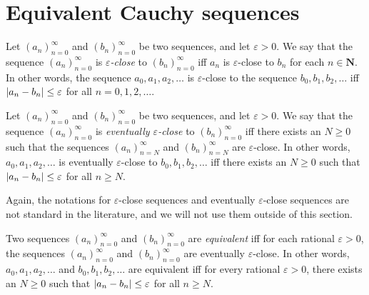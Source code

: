 \section{Equivalent Cauchy sequences}\label{sec 5.2}

\begin{definition}\label{5.2.1}
Let \((a_n)_{n = 0}^{\infty}\) and \((b_n)_{n = 0}^{\infty}\) be two sequences, and let \(\varepsilon > 0\).
We say that the sequence \((a_n)_{n = 0}^{\infty}\) is \emph{\(\varepsilon\)-close} to \((b_n)_{n = 0}^{\infty}\) iff \(a_n\) is \(\varepsilon\)-close to \(b_n\) for each \(n \in \mathbf{N}\).
In other words, the sequence \(a_0, a_1, a_2, \dots\) is \(\varepsilon\)-close to the sequence \(b_0, b_1, b_2, \dots\) iff \(\abs*{a_n - b_n} \leq \varepsilon\) for all \(n = 0, 1, 2, \dots\).
\end{definition}

\setcounter{theorem}{2}
\begin{definition}\label{5.2.3}
Let \((a_n)_{n = 0}^{\infty}\) and \((b_n)_{n = 0}^{\infty}\) be two sequences, and let \(\varepsilon > 0\).
We say that the sequence \((a_n)_{n = 0}^{\infty}\) is \emph{eventually \(\varepsilon\)-close} to \((b_n)_{n = 0}^{\infty}\) iff there exists an \(N \geq 0\) such that the sequences \((a_n)_{n = N}^{\infty}\) and \((b_n)_{n = N}^{\infty}\) are \(\varepsilon\)-close.
In other words, \(a_0, a_1, a_2, \dots\) is eventually \(\varepsilon\)-close to \(b_0, b_1, b_2, \dots\) iff there exists an \(N \geq 0\) such that \(\abs*{a_n - b_n} \leq \varepsilon\) for all \(n \geq N\).
\end{definition}

\begin{remark}\label{5.2.4}
Again, the notations for \(\varepsilon\)-close sequences and eventually \(\varepsilon\)-close sequences are not standard in the literature, and we will not use them outside of this section.
\end{remark}

\setcounter{theorem}{5}
\begin{definition}\label{5.2.6}
Two sequences \((a_n)_{n = 0}^{\infty}\) and \((b_n)_{n = 0}^{\infty}\) are \emph{equivalent} iff for each rational \(\varepsilon > 0\), the sequences \((a_n)_{n = 0}^{\infty}\) and \((b_n)_{n = 0}^{\infty}\) are eventually \(\varepsilon\)-close.
In other words, \(a_0, a_1, a_2, \dots\) and \(b_0, b_1, b_2, \dots\) are equivalent iff for every rational \(\varepsilon > 0\), there exists an \(N \geq 0\) such that \(\abs*{a_n - b_n} \leq \varepsilon\) for all \(n \geq N\).
\end{definition}


